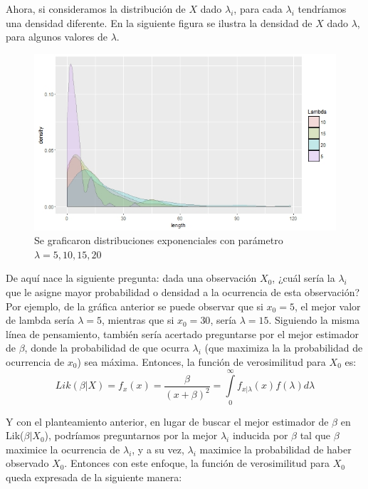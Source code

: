 Ahora, si consideramos la distribución de $ X$ dado $\lambda_{i}$, para cada $\lambda_{i}$ tendríamos una densidad diferente. En la siguiente figura se ilustra la densidad de $X$ dado $\lambda$, para algunos valores de $ \lambda$.\\

\begin{figure}[h]
\centering
\includegraphics[width=1\linewidth]{Figuras/LAMBDAS}
\caption{Se graficaron distribuciones exponenciales con parámetro $\lambda=5, 10, 15, 20$}
\end{figure}

De aquí nace la siguiente pregunta: dada una observación $ X_0$, ¿cuál sería la $ \lambda_{i}$ que le asigne mayor probabilidad o densidad a la ocurrencia de esta observación? Por ejemplo, de la gráfica anterior se puede observar que si $x_{0}=5$, el mejor valor de lambda sería $\lambda=5$, mientras que si $x_{0}=30$, sería $\lambda=15$. Siguiendo la misma línea de pensamiento, también sería acertado preguntarse por el mejor estimador de $\beta$, donde la probabilidad de que ocurra $\lambda_{i}$ (que maximiza la la probabilidad de ocurrencia de $x_{0}$) sea máxima. Entonces, la función de verosimilitud para $X_{0}$ es:\\
\begin{equation*}
 Lik(\beta|X)=f_{x}(x)=\dfrac{\beta}{(x+\beta)^{2}}=\underset{0}{\overset{\infty }{\int }}f_{x|\lambda}(x)f(\lambda)d\lambda
\end{equation*}

 
Y con el planteamiento anterior, en lugar de buscar el mejor estimador de $\beta$ en Lik($\beta|X_{0}$), podríamos preguntarnos por la mejor $\lambda_{i}$ inducida por $\beta$ tal que $\beta$ maximice la ocurrencia de $\lambda_{i}$, y a su vez, $\lambda_{i}$ maximice la probabilidad de haber observado  $X_{0}$. Entonces con este enfoque, la función de verosimilitud para $X_{0}$ queda expresada de la siguiente manera:


